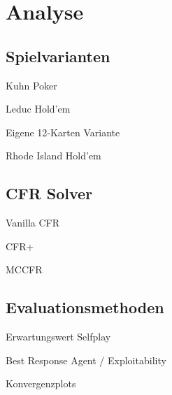\chapter{Analyse}

\section{Spielvarianten}
Kuhn Poker

Leduc Hold'em

Eigene 12-Karten Variante

Rhode Island Hold'em

\section{CFR Solver}
Vanilla CFR

CFR+

MCCFR

\section{Evaluationsmethoden}
Erwartungswert Selfplay

Best Response Agent / Exploitability

Konvergenzplots

